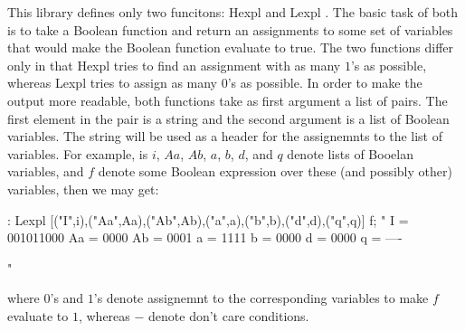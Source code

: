 This library defines only two funcitons: Hexpl%
%
{} and Lexpl%
%
{}.
The basic task of both is to take a Boolean function and
return an assignments to some set of variables that would make
the Boolean function evaluate to true.
The two functions differ only in that Hexpl tries to find an
assignment with as many $1$'s as possible, whereas Lexpl tries to
assign as many $0$'s as possible.
In order to make the output more readable, both functions take as
first argument a list of pairs.
The first element in the pair is a string and the second argument
is a list of Boolean variables.
The string will be used as a header for the assignemnts to the list of
variables.
For example, is $i$, $Aa$, $Ab$, $a$, $b$, $d$, and $q$ denote lists of
Booelan variables, and $f$ denote some Boolean expression over
these (and possibly other) variables, then we may get:
\begin{hol}
: Lexpl [("I",i),("Aa",Aa),("Ab",Ab),("a",a),("b",b),("d",d),("q",q)] f;
"
I = 001011000
Aa = 0000
Ab = 0001
a = 1111
b = 0000
d = 0000
q = ----

"
\end{hol}
where $0$'s and $1$'s denote assignemnt to the corresponding variables to
make $f$ evaluate to $1$, whereas $-$ denote don't care conditions.
